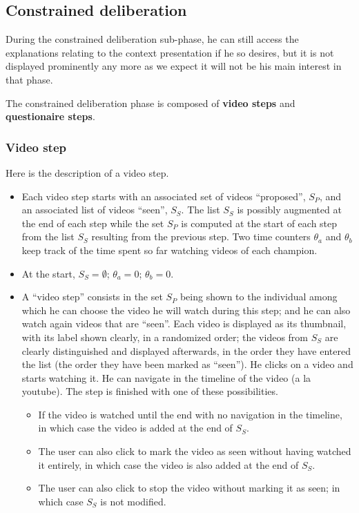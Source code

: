 \documentclass[version=3.21, pagesize, twoside=off, bibliography=totoc, DIV=calc, fontsize=12pt, a4paper]{scrartcl}
\begin{document}
\subsection{Constrained deliberation}
During the constrained deliberation sub-phase, he can still access the explanations relating to the context presentation if he so desires, but it is not displayed prominently any more as we expect it will not be his main interest in that phase.

The constrained deliberation phase is composed of \textbf{video steps} and \textbf{questionaire steps}. 

\subsubsection{Video step}
Here is the description of a video step.
\begin{itemize}
	\item Each video step starts with an associated set of videos “proposed”, $S_P$, and an associated list of videos “seen”, $S_S$. The list $S_S$ is possibly augmented at the end of each step while the set $S_P$ is computed at the start of each step from the list $S_S$ resulting from the previous step. Two time counters $\theta_a$ and $\theta_b$ keep track of the time spent so far watching videos of each champion.
	\item At the start, $S_S = \emptyset$; $\theta_a = 0$; $\theta_b = 0$.
	\item A “video step” consists in the set $S_P$ being shown to the individual among which he can choose the video he will watch during this step; and he can also watch again videos that are “seen”. Each video is displayed as its thumbnail, with its label shown clearly, in a randomized order; the videos from $S_S$ are clearly distinguished and displayed afterwards, in the order they have entered the list (the order they have been marked as “seen”). He clicks on a video and starts watching it. 
He can navigate in the timeline of the video (a la youtube).
The step is finished with one of these possibilities.
	\begin{itemize}
		\item If the video is watched until the end with no navigation in the timeline, in which case the video is added at the end of $S_S$. 
		\item The user can also click to mark the video as seen without having watched it entirely, in which case the video is also added at the end of $S_S$.
		\item The user can also click to stop the video without marking it as seen; in which case $S_S$ is not modified.

\end{itemize}
\end{itemize}
\end{document}
